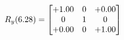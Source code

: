 \documentclass[preview]{standalone}
\begin{document}
\begin{align*}
\special{dvisvgm:raw <g id='unique000'>}R_{y}(6.28) = \begin{bmatrix}+1.00 & 0 & +0.00 \\0 & 1 & 0 \\+0.00 & 0 & +1.00\end{bmatrix}\special{dvisvgm:raw </g>}
\end{align*}
\end{document}
